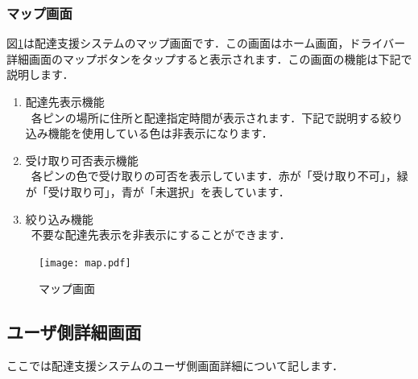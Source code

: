 \documentclass[a4j,titlepage]{jarticle}
\begin{document}
\subsubsection{マップ画面}
図\ref{fig:map}は配達支援システムのマップ画面です．この画面はホーム画面，ドライバー詳細画面のマップボタンをタップすると表示されます．この画面の機能は下記で説明します．
\begin{enumerate}
	\item 配達先表示機能\\
	 \ 各ピンの場所に住所と配達指定時間が表示されます．下記で説明する絞り込み機能を使用している色は非表示になります．
	\item 受け取り可否表示機能\\
	 \ 各ピンの色で受け取りの可否を表示しています．赤が「受け取り不可」，緑が「受け取り可」，青が「未選択」を表しています．
	\item 絞り込み機能\\
   \ 不要な配達先表示を非表示にすることができます．

\end{enumerate}

\begin{figure}[htbp]
 \begin{center}
  \texttt{[image: map.pdf]}
	\caption{マップ画面}
	\label{fig:map}
 \end{center}

\end{figure}

\newpage

\subsection{ユーザ側詳細画面}
ここでは配達支援システムのユーザ側画面詳細について記します．
\end{document}

